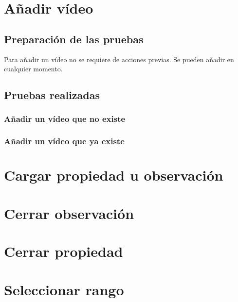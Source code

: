 \section{A\~nadir v\'ideo}
\subsection{Preparaci\'on de las pruebas}
Para a\~nadir un v\'ideo no se requiere de acciones previas.
Se pueden a\~nadir en cualquier momento.

\subsection{Pruebas realizadas}
\subsubsection{A\~nadir un v\'ideo que no existe}

\subsubsection{A\~nadir un v\'ideo que ya existe}

\section{Cargar propiedad u observaci\'on}

\section{Cerrar observaci\'on}

\section{Cerrar propiedad}

\section{Seleccionar rango}